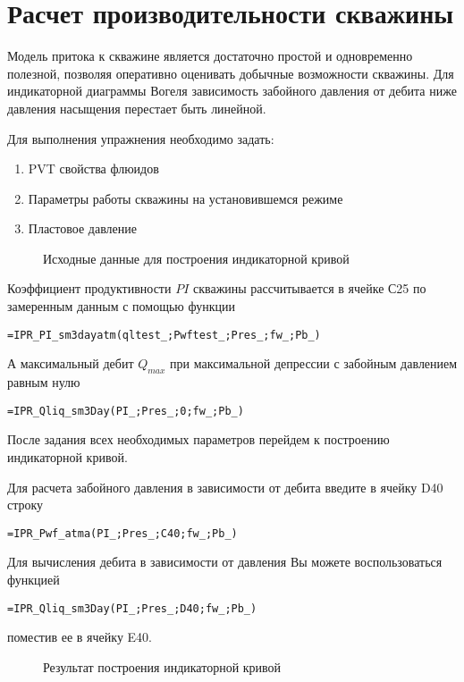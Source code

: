 \section{Расчет производительности скважины}

Модель притока к скважине является достаточно простой и одновременно полезной, позволяя оперативно оценивать добычные возможности скважины. Для индикаторной диаграммы Вогеля зависимость забойного давления от дебита ниже давления насыщения перестает быть линейной.

Для выполнения упражнения необходимо задать:
\begin{enumerate}
	\item PVT свойства флюидов
	\item Параметры работы скважины на установившемся режиме
	\item Пластовое давление
\end{enumerate}


\begin{figure}[h!]
	\center{\texttt{[image: Ex20\_1]}}
	\caption{Исходные данные для построения индикаторной кривой}
	\label{ris:Ex20_1}
\end{figure}

Коэффициент продуктивности $PI$ скважины рассчитывается в ячейке С25 по замеренным данным  с помощью функции

{ \small  \texttt{=IPR\_PI\_sm3dayatm(qltest\_;Pwftest\_;Pres\_;fw\_;Pb\_)}}

А максимальный дебит $Q_{max}$ при максимальной депрессии с забойным давлением равным нулю

{ \small  \texttt{=IPR\_Qliq\_sm3Day(PI\_;Pres\_;0;fw\_;Pb\_)}}

После задания всех необходимых параметров перейдем к построению индикаторной кривой.

Для расчета забойного давления в зависимости от дебита введите в ячейку D40 строку

{ \small  \texttt{=IPR\_Pwf\_atma(PI\_;Pres\_;C40;fw\_;Pb\_)}}

Для вычисления дебита в зависимости от давления Вы можете воспользоваться функцией 

{ \small  \texttt{=IPR\_Qliq\_sm3Day(PI\_;Pres\_;D40;fw\_;Pb\_)}}

поместив ее в ячейку E40.

\begin{figure}[h!]
	\center{\texttt{[image: Ex20\_2]}}
	\caption{Результат построения индикаторной кривой}
	\label{ris:Ex20_2}
\end{figure}

